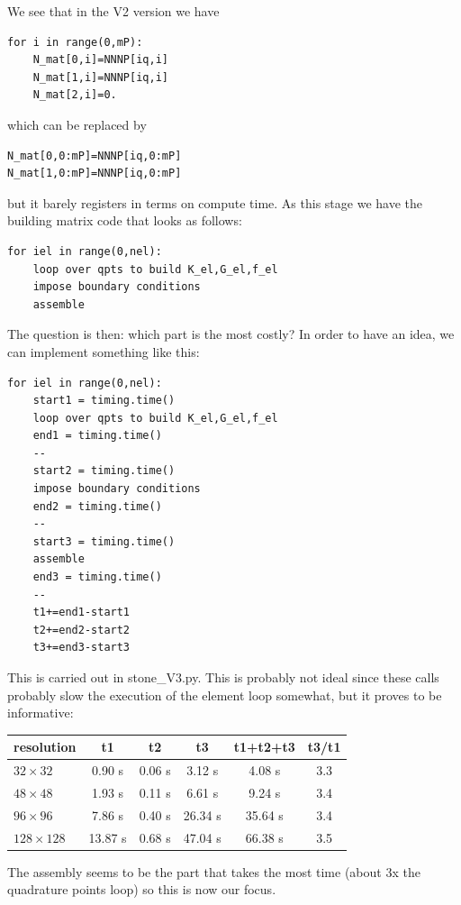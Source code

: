We see that in the V2 version we have 
\begin{lstlisting}
for i in range(0,mP):
    N_mat[0,i]=NNNP[iq,i]
    N_mat[1,i]=NNNP[iq,i]
    N_mat[2,i]=0.
\end{lstlisting}
which can be replaced by
\begin{lstlisting}
N_mat[0,0:mP]=NNNP[iq,0:mP]
N_mat[1,0:mP]=NNNP[iq,0:mP]
\end{lstlisting}
but it barely registers in terms on compute time. 
As this stage we have the building matrix code that looks as 
follows:
\begin{lstlisting}
for iel in range(0,nel):
    loop over qpts to build K_el,G_el,f_el
    impose boundary conditions
    assemble
\end{lstlisting}
The question is then: which part is the most costly?
In order to have an idea, we can implement something like this:
\begin{lstlisting}
for iel in range(0,nel):
    start1 = timing.time()
    loop over qpts to build K_el,G_el,f_el
    end1 = timing.time()
    --
    start2 = timing.time()
    impose boundary conditions
    end2 = timing.time()
    --
    start3 = timing.time()
    assemble
    end3 = timing.time()
    --
    t1+=end1-start1
    t2+=end2-start2
    t3+=end3-start3
\end{lstlisting}
This is carried out in {\pythonfile stone\_V3.py}.
This is probably not ideal since these calls probably slow the execution 
of the element loop somewhat, but it proves to be informative:
\begin{center}
\begin{tabular}{lccccc}
\hline
resolution & t1 & t2 & t3 & t1+t2+t3 & t3/t1\\ 
\hline
\hline
$32\times 32$   & 0.90  s& 0.06 s& 3.12  s& 4.08  s & 3.3\\ 
$48\times 48$   & 1.93  s& 0.11 s& 6.61  s& 9.24  s & 3.4\\
$96\times 96$   & 7.86  s& 0.40 s& 26.34 s& 35.64 s & 3.4\\
$128\times 128$ & 13.87 s& 0.68 s& 47.04 s& 66.38 s & 3.5\\
\hline
\end{tabular}
\end{center}
The assembly seems to be the part that takes the most time (about 3x the quadrature points loop) so 
this is now our focus.

